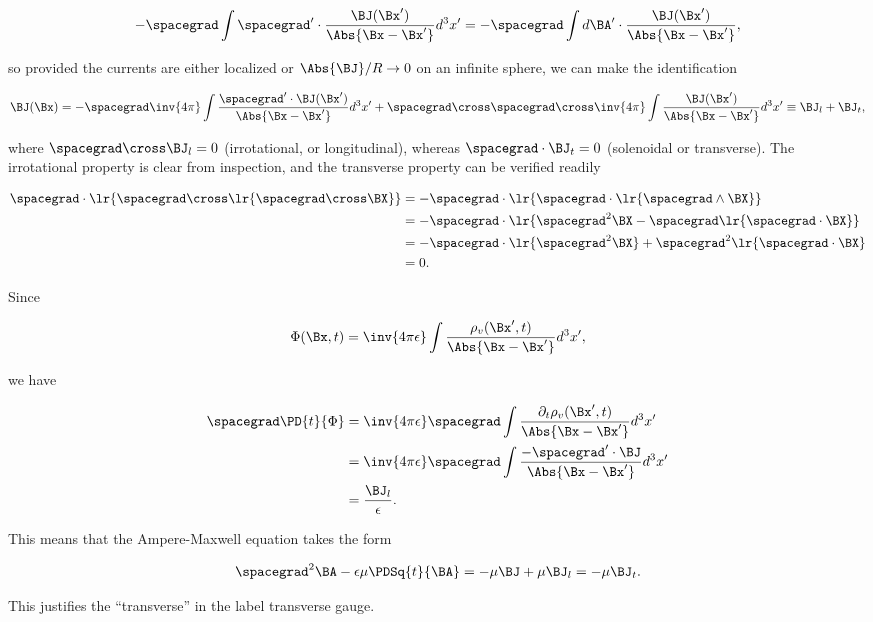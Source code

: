 \begin{dmath}\label{eqn:transverseGauge:320}
-\spacegrad
\int \spacegrad' \cdot \frac{\BJ(\Bx')}{\Abs{\Bx - \Bx'}} d^3 x'
=
-\spacegrad
\int d\BA' \cdot \frac{\BJ(\Bx')}{\Abs{\Bx - \Bx'}},
\end{dmath}

so provided the currents are either localized or \( \Abs{\BJ}/R \rightarrow 0 \) on an infinite sphere, we can make the identification

\begin{equation}\label{eqn:transverseGauge:340}
\BJ(\Bx)
=
-\spacegrad \inv{4 \pi} \int \frac{\spacegrad' \cdot \BJ(\Bx')}{\Abs{\Bx - \Bx'}} d^3 x'
+
\spacegrad \cross \spacegrad \cross \inv{4 \pi} \int \frac{\BJ(\Bx')}{\Abs{\Bx - \Bx'}} d^3 x'
\equiv
\BJ_l +
\BJ_t,
\end{equation}

where \( \spacegrad \cross \BJ_l = 0 \) (irrotational, or longitudinal), whereas \( \spacegrad \cdot \BJ_t = 0 \) (solenoidal or transverse).  The irrotational property is clear from inspection, and the transverse property can be verified readily

\begin{dmath}\label{eqn:transverseGauge:360}
\begin{aligned}
\spacegrad \cdot \lr{ \spacegrad \cross \lr{ \spacegrad \cross \BX } }
&=
-\spacegrad \cdot \lr{ \spacegrad \cdot \lr{ \spacegrad \wedge \BX } } \\
&=
-\spacegrad \cdot \lr{ \spacegrad^2 \BX - \spacegrad \lr{ \spacegrad \cdot \BX } } \\
&=
-\spacegrad \cdot \lr{\spacegrad^2 \BX} + \spacegrad^2 \lr{ \spacegrad \cdot \BX } \\
&= 0.
\end{aligned}
\end{dmath}

Since

\begin{dmath}\label{eqn:transverseGauge:380}
\Phi(\Bx, t)
=
\inv{4 \pi \epsilon} \int \frac{\rho_v(\Bx', t)}{\Abs{\Bx - \Bx'}} d^3 x',
\end{dmath}

we have

\begin{dmath}\label{eqn:transverseGauge:400}
\begin{aligned}
\spacegrad \PD{t}{\Phi}
&=
\inv{4 \pi \epsilon} \spacegrad \int \frac{\partial_t \rho_v(\Bx', t)}{\Abs{\Bx - \Bx'}} d^3 x' \\
&=
\inv{4 \pi \epsilon} \spacegrad \int \frac{-\spacegrad' \cdot \BJ}{\Abs{\Bx - \Bx'}} d^3 x' \\
&=
\frac{\BJ_l}{\epsilon}.
\end{aligned}
\end{dmath}

This means that the Ampere-Maxwell equation takes the form

\begin{equation}\label{eqn:transverseGauge:420}
\spacegrad^2 \BA - \epsilon \mu \PDSq{t}{\BA}
= -\mu \BJ + \mu \BJ_l
= -\mu \BJ_t.
\end{equation}

This justifies the ``transverse'' in the label transverse gauge.

\EndArticle
